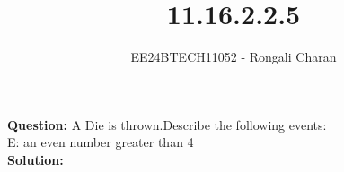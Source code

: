 \documentclass[journal]{IEEEtran}
\numberwithin{equation}{enumi}
\numberwithin{figure}{enumi}
\begin{document}


\title{11.16.2.2.5}
\author{EE24BTECH11052 - Rongali Charan}

{\let\newpage\relax\maketitle}

\textbf{Question:} A Die is thrown.Describe the following events:\\
E: an even number greater than 4\\

\textbf{Solution:}\\
\end{document}
